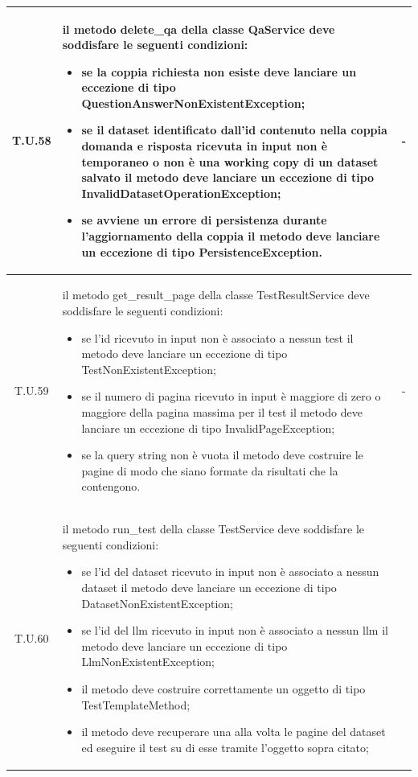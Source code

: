\begin{tabularx}{\textwidth}{|c|X|c|}
    \hline 
    \label{tu:tu58} T.U.58 & il metodo delete\_qa della classe QaService deve soddisfare le seguenti condizioni:
    \begin{itemize}
        \item se la coppia richiesta non esiste deve lanciare un eccezione di tipo QuestionAnswerNonExistentException;
        \item se il dataset identificato dall'id contenuto nella coppia domanda e risposta ricevuta in input non è temporaneo o non è una working copy di un dataset salvato il metodo deve lanciare un eccezione di tipo InvalidDatasetOperationException;
        \item se avviene un errore di persistenza durante l'aggiornamento della coppia il metodo deve lanciare un eccezione di tipo PersistenceException.
    \end{itemize} & - \\
    \hline 
    \label{tu:tu59} T.U.59 & il metodo get\_result\_page della classe TestResultService deve soddisfare le seguenti condizioni:
    \begin{itemize}
        \item se l'id ricevuto in input non è associato a nessun test il metodo deve lanciare un eccezione di tipo TestNonExistentException;
        \item se il numero di pagina ricevuto in input è maggiore di zero o maggiore della pagina massima per il test il metodo deve lanciare un eccezione di tipo InvalidPageException;
        \item se la query string non è vuota il metodo deve costruire le pagine di modo che siano  formate da risultati che la contengono.
    \end{itemize} & - \\
    \hline 
    \label{tu:tu60} T.U.60 & il metodo run\_test della classe TestService deve soddisfare le seguenti condizioni:
    \begin{itemize}
        \item se l'id del dataset ricevuto in input non è associato a nessun dataset il metodo deve lanciare un eccezione di tipo DatasetNonExistentException;
        \item se l'id del llm ricevuto in input non è associato a nessun llm il metodo deve lanciare un eccezione di tipo LlmNonExistentException;
        \item il metodo deve costruire correttamente un oggetto di tipo TestTemplateMethod;
        \item il metodo deve recuperare una alla volta le pagine del dataset ed eseguire il test su di esse tramite l'oggetto sopra citato;

\end{itemize}
\end{tabularx}
